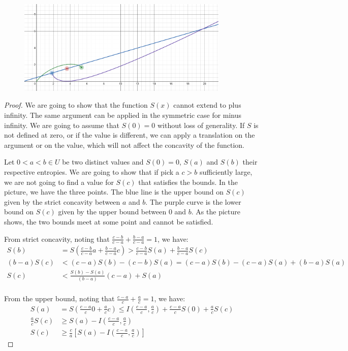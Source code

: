 \begin{figure}[h]
	\includegraphics[width=0.9\textwidth]{tempimages/BoundsFromEntropy.png}
\end{figure}
\begin{proof}
	We are going to show that the function $S(x)$ cannot extend to plus infinity. The same argument can be applied in the symmetric case for minus infinity. We are going to assume that $S(0) = 0$ without loss of generality. If $S$ is not defined at zero, or if the value is different, we can apply a translation on the argument or on the value, which will not affect the concavity of the function.
	
	Let $0 < a < b \in U$ be two distinct values and $S(0)=0$, $S(a)$ and $S(b)$ their respective entropies. We are going to show that if pick a $c > b$ sufficiently large, we are not going to find a value for $S(c)$ that satisfies the bounds. In the picture, we have the three points. The blue line is the upper bound on $S(c)$ given by the strict concavity between $a$ and $b$. The purple curve is the lower bound on $S(c)$ given by the upper bound between $0$ and $b$. As the picture shows, the two bounds meet at some point and cannot be satisfied.
	
	From strict concavity, noting that $\frac{c-b}{c-a} + \frac{b-a}{c-a} = 1$, we have:
	\begin{equation}
		\begin{aligned}
			S(b) &= S\left(\frac{c-b}{c-a} a + \frac{b-a}{c-a} c\right) > \frac{c-b}{c-a} S(a) + \frac{b-a}{c-a} S(c)\\
			(b-a)S(c) &< (c-a) S(b) - (c-b) S(a) = (c-a) S(b) - (c-a) S(a) + (b-a) S(a) \\
			S(c) &< \frac{S(b) - S(a)}{(b-a)} (c-a) + S(a) \\
		\end{aligned}
	\end{equation}
	
	From the upper bound, noting that $\frac{c-a}{c} + \frac{a}{c} = 1$, we have:
	\begin{equation}
		\begin{aligned}
			S(a) &= S\left(\frac{c-a}{c} 0 + \frac{a}{c} c\right) \leq I\left(\frac{c-a}{c}, \frac{a}{c}\right) + \frac{c-a}{c} S(0) +\frac{a}{c} S(c) \\
			\frac{a}{c} S(c) &\geq S(a) - I\left(\frac{c-a}{c}, \frac{a}{c}\right) \\
			S(c) &\geq \frac{c}{a} \left[ S(a) - I\left(\frac{c-a}{c}, \frac{a}{c}\right) \right]
		\end{aligned}
	\end{equation}
	

\end{proof}
